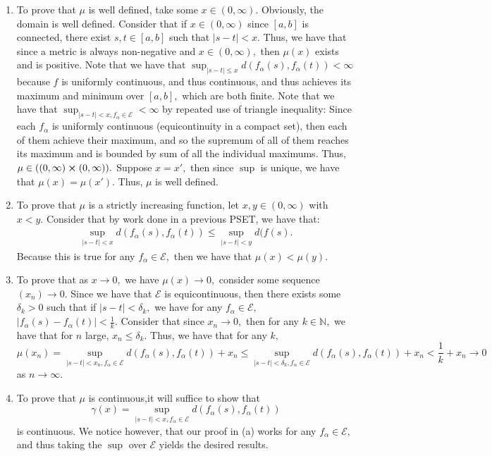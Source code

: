 \documentclass[11pt]{article}
\newcommand{\bbN}{\mathbb{N}}
\begin{document}
\begin{enumerate}
\begin{solution}
\begin{itemize}
\begin{enumerate}
                \item To prove that $\mu$ is well defined, take some $x \in (0,\infty).$ Obviously, the domain is well defined. Consider that if $x\in (0,\infty)$ since $[a,b]$ is connected, there exist $s,t \in [a,b]$ such that $|s-t|< x.$ Thus, we have that since a metric is always non-negative and $x\in (0,\infty),$ then $\mu(x)$ exists and is positive. Note that we have that $\sup_{|s-t|\leq x}d(f_\alpha(s), f_\alpha(t))< \infty$ because $f$ is uniformly continuous, and thus continuous, and thus achieves its maximum and minimum over $[a,b],$ which are both finite. Note that we have that $\sup_{|s-t|< x, f_\alpha \in \mathcal{E}}< \infty$ by repeated use of triangle inequality: Since each $f_\alpha$ is uniformly continuous (equicontinuity in a compact set), then each of them achieve their maximum, and so the supremum of all of them reaches its maximum and is bounded by sum of all the individual maximums. Thus, $\mu \in ((0,\infty) \cross (0,\infty)).$ Suppose $x = x',$ then since $\sup$ is unique, we have that $\mu(x) = \mu(x').$ Thus, $\mu$ is well defined.  
                \item To prove that $\mu$ is a strictly increasing function, let $x,y \in (0,\infty)$ with $x<y.$ Consider that by work done in a previous PSET, we have that:
                \begin{align}
                    \sup_{|s-t|< x}d(f_\alpha(s), f_\alpha(t)) \leq \sup_{|s-t|<y}d(f(s).
                \end{align} 
                Because this is true for any $f_\alpha \in \mathcal{E},$ then we have that $\mu(x)< \mu(y).$
            \item 
            To prove that as $x\to 0,$ we have $\mu(x)\to 0,$ consider some sequence $(x_n) \to 0.$ Since we have that $\mathcal{E}$ is  equicontinuous, then there exists some $\delta_k >0$ such that if $|s-t|< \delta_k,$ we have for any $f_\alpha \in \mathcal{E},$ $|f_\alpha(s) - f_\alpha(t)|< \frac{1}{k}.$ Consider that since $x_n \to 0,$ then for any $k \in \bbN,$ we have that for $n$ large, $x_n \leq \delta_k$. Thus, we have that for any $k,$
            \[\mu(x_n) = \sup_{|s-t| < x_n, f_\alpha\in \mathcal{E}}d(f_\alpha(s), f_\alpha(t)) + x_n \leq \sup_{|s-t| < \delta_k, f_\alpha\in \mathcal{E}}d(f_\alpha(s), f_\alpha(t)) + x_n < \frac{1}{k} + x_n \to 0\] as $n\to \infty.$
            \item To prove that $\mu$ is continuous,it will suffice to show that 
            \[\gamma(x) = \sup_{|s-t|< x, f_\alpha\in \mathcal{E}}d(f_\alpha(s), f_\alpha(t))\] is continuous. We notice however, that our proof in (a) works for any $f_\alpha \in \mathcal{E},$ and thus taking the $\sup$ over $\mathcal{E}$ yields the desired results.

\end{enumerate}
\end{itemize}
\end{solution}
\end{enumerate}
\end{document}
